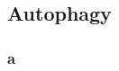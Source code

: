     
    
    
    
    
    
    
        
        
        
     \newpage   
    \subsection{Autophagy}
    


        \subsubsection{a}
